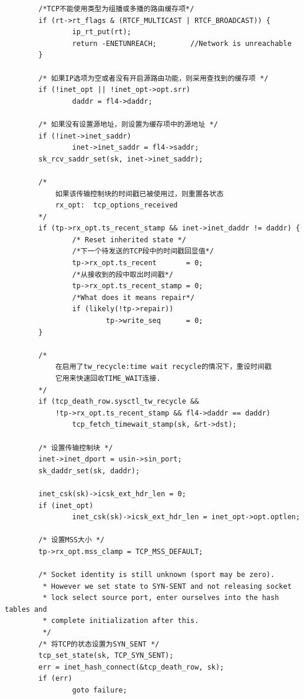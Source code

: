 \begin{verbatim}
        /*TCP不能使用类型为组播或多播的路由缓存项*/
        if (rt->rt_flags & (RTCF_MULTICAST | RTCF_BROADCAST)) {
                ip_rt_put(rt);
                return -ENETUNREACH;        //Network is unreachable
        }

        /* 如果IP选项为空或者没有开启源路由功能，则采用查找到的缓存项 */
        if (!inet_opt || !inet_opt->opt.srr)
                daddr = fl4->daddr;

        /* 如果没有设置源地址，则设置为缓存项中的源地址 */
        if (!inet->inet_saddr)
                inet->inet_saddr = fl4->saddr;
        sk_rcv_saddr_set(sk, inet->inet_saddr);

        /* 
			如果该传输控制块的时间戳已被使用过，则重置各状态 
            rx_opt:  tcp_options_received
        */
        if (tp->rx_opt.ts_recent_stamp && inet->inet_daddr != daddr) {
                /* Reset inherited state */
                /*下一个待发送的TCP段中的时间戳回显值*/
                tp->rx_opt.ts_recent       = 0;     
                /*从接收到的段中取出时间戳*/
                tp->rx_opt.ts_recent_stamp = 0;
                /*What does it means repair*/       
                if (likely(!tp->repair))
                        tp->write_seq      = 0;
        }

        /*  
			在启用了tw_recycle:time wait recycle的情况下，重设时间戳 
            它用来快速回收TIME_WAIT连接.
        */
        if (tcp_death_row.sysctl_tw_recycle &&
            !tp->rx_opt.ts_recent_stamp && fl4->daddr == daddr)
                tcp_fetch_timewait_stamp(sk, &rt->dst);

        /* 设置传输控制块 */
        inet->inet_dport = usin->sin_port;
        sk_daddr_set(sk, daddr);

        inet_csk(sk)->icsk_ext_hdr_len = 0;
        if (inet_opt)
                inet_csk(sk)->icsk_ext_hdr_len = inet_opt->opt.optlen;

        /* 设置MSS大小 */
        tp->rx_opt.mss_clamp = TCP_MSS_DEFAULT;

        /* Socket identity is still unknown (sport may be zero).
         * However we set state to SYN-SENT and not releasing socket
         * lock select source port, enter ourselves into the hash tables and
         * complete initialization after this.
         */
        /* 将TCP的状态设置为SYN_SENT */
        tcp_set_state(sk, TCP_SYN_SENT);
        err = inet_hash_connect(&tcp_death_row, sk);
        if (err)
                goto failure;


\end{verbatim}

